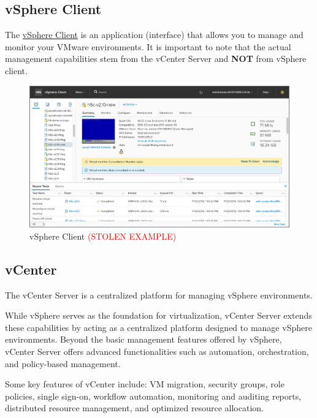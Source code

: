 \subsection{vSphere Client}
The \href{https://docs.vmware.com/en/VMware-vSphere/7.0/com.vmware.vsphere.vcenterhost.doc/GUID-A618EF76-638A-49DA-991D-B93C5AC0E2B1.html}{vSphere Client} is an application (interface) that allows you to manage and monitor your VMware environments. It is important to note that the actual management capabilities stem from the vCenter Server and \textbf{NOT} from vSphere client.

\begin{figure}[H]
    \centering
    \includegraphics[scale = 0.9]{images/vsphere-client.jpg}
    \caption{vSphere Client \textcolor{red}{(STOLEN EXAMPLE)} }
    \label{vSphere Client}
\end{figure}

\subsection{vCenter}
The vCenter Server is a centralized platform for managing vSphere environments. 

While vSphere serves as the foundation for virtualization, vCenter Server extends these capabilities by acting as a centralized platform designed to manage vSphere environments. Beyond the basic management features offered by vSphere, vCenter Server offers advanced functionalities such as automation, orchestration, and policy-based management.

Some key features of vCenter include: VM migration, security groups, role policies, single sign-on, workflow automation, monitoring and auditing reports, distributed resource management, and optimized resource allocation.

